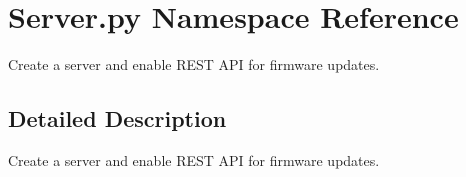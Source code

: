 \hypertarget{namespaceServer_1_1py}{}\section{Server.\+py Namespace Reference}
\label{namespaceServer_1_1py}


Create a server and enable R\+E\+ST A\+PI for firmware updates.  




\subsection{Detailed Description}
Create a server and enable R\+E\+ST A\+PI for firmware updates. 